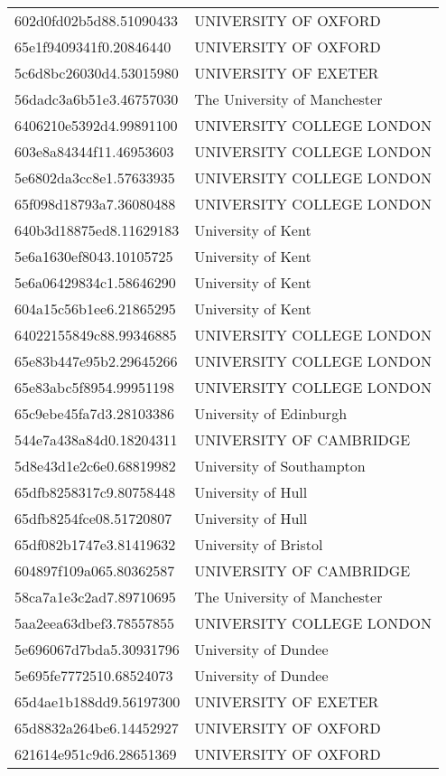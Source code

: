 \begin{tabular}{ll}
602d0fd02b5d88.51090433 & UNIVERSITY OF OXFORD \\
65e1f9409341f0.20846440 & UNIVERSITY OF OXFORD \\
5c6d8bc26030d4.53015980 & UNIVERSITY OF EXETER \\
56dadc3a6b51e3.46757030 & The University of Manchester \\
6406210e5392d4.99891100 & UNIVERSITY COLLEGE LONDON \\
603e8a84344f11.46953603 & UNIVERSITY COLLEGE LONDON \\
5e6802da3cc8e1.57633935 & UNIVERSITY COLLEGE LONDON \\
65f098d18793a7.36080488 & UNIVERSITY COLLEGE LONDON \\
640b3d18875ed8.11629183 & University of Kent \\
5e6a1630ef8043.10105725 & University of Kent \\
5e6a06429834c1.58646290 & University of Kent \\
604a15c56b1ee6.21865295 & University of Kent \\
64022155849c88.99346885 & UNIVERSITY COLLEGE LONDON \\
65e83b447e95b2.29645266 & UNIVERSITY COLLEGE LONDON \\
65e83abc5f8954.99951198 & UNIVERSITY COLLEGE LONDON \\
65c9ebe45fa7d3.28103386 & University of Edinburgh \\
544e7a438a84d0.18204311 & UNIVERSITY OF CAMBRIDGE \\
5d8e43d1e2c6e0.68819982 & University of Southampton \\
65dfb8258317c9.80758448 & University of Hull \\
65dfb8254fce08.51720807 & University of Hull \\
65df082b1747e3.81419632 & University of Bristol \\
604897f109a065.80362587 & UNIVERSITY OF CAMBRIDGE \\
58ca7a1e3c2ad7.89710695 & The University of Manchester \\
5aa2eea63dbef3.78557855 & UNIVERSITY COLLEGE LONDON \\
5e696067d7bda5.30931796 & University of Dundee \\
5e695fe7772510.68524073 & University of Dundee \\
65d4ae1b188dd9.56197300 & UNIVERSITY OF EXETER \\
65d8832a264be6.14452927 & UNIVERSITY OF OXFORD \\
621614e951c9d6.28651369 & UNIVERSITY OF OXFORD \\

\end{tabular}
